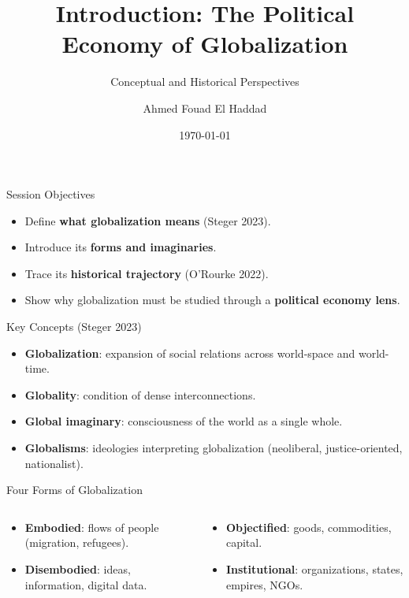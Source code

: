 \documentclass[10pt]{beamer}
\title{Introduction: The Political Economy of Globalization}
\subtitle{Conceptual and Historical Perspectives}
\author{Ahmed Fouad El Haddad}
\institute{UPEC -- IEP Fontainebleau}
\date{\today}
\begin{document}
\begin{frame}
  \titlepage
\end{frame}

\begin{frame}{Session Objectives}
\begin{itemize}
    \item Define \textbf{what globalization means} (Steger 2023).
    \item Introduce its \textbf{forms and imaginaries}.
    \item Trace its \textbf{historical trajectory} (O’Rourke 2022).
    \item Show why globalization must be studied through a \textbf{political economy lens}.
\end{itemize}
\end{frame}

\begin{frame}{Key Concepts (Steger 2023)}
\begin{itemize}
    \item \textbf{Globalization}: expansion of social relations across world-space and 
world-time.
    \item \textbf{Globality}: condition of dense interconnections.
    \item \textbf{Global imaginary}: consciousness of the world as a single whole.
    \item \textbf{Globalisms}: ideologies interpreting globalization (neoliberal, 
justice-oriented, nationalist).
\end{itemize}
\end{frame}

\begin{frame}{Four Forms of Globalization}
\begin{columns}
\begin{column}{0.5\textwidth}
\begin{itemize}
    \item \textbf{Embodied}: flows of people (migration, refugees).
    \item \textbf{Disembodied}: ideas, information, digital data.
\end{itemize}
\end{column}
\begin{column}{0.5\textwidth}
\begin{itemize}
    \item \textbf{Objectified}: goods, commodities, capital.
    \item \textbf{Institutional}: organizations, states, empires, NGOs.
\end{itemize}
\end{column}
\end{columns}
\end{frame}
\end{document}
